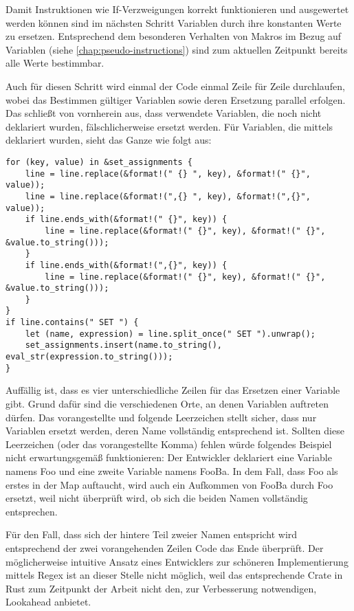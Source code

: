 Damit Instruktionen wie If-Verzweigungen korrekt funktionieren und ausgewertet werden können sind im nächsten Schritt Variablen durch ihre konstanten Werte zu ersetzen. Entsprechend dem besonderen Verhalten von Makros im Bezug auf Variablen (siehe \ref{chap:pseudo-instructions}) sind zum aktuellen Zeitpunkt bereits alle Werte bestimmbar.

Auch für diesen Schritt wird einmal der Code einmal Zeile für Zeile durchlaufen, wobei das Bestimmen gültiger Variablen sowie deren Ersetzung parallel erfolgen. Das schließt von vornherein aus, dass verwendete Variablen, die noch nicht deklariert wurden, fälschlicherweise ersetzt werden. Für Variablen, die mittels  deklariert wurden, sieht das Ganze wie folgt aus:

\begin{verbatim}
for (key, value) in &set_assignments {
	line = line.replace(&format!(" {} ", key), &format!(" {}", value));
    line = line.replace(&format!(",{} ", key), &format!(",{}", value));
    if line.ends_with(&format!(" {}", key)) {
    	line = line.replace(&format!(" {}", key), &format!(" {}", &value.to_string()));
    }
    if line.ends_with(&format!(",{}", key)) {
        line = line.replace(&format!(" {}", key), &format!(" {}", &value.to_string()));
    }
}
if line.contains(" SET ") {
	let (name, expression) = line.split_once(" SET ").unwrap();
    set_assignments.insert(name.to_string(), eval_str(expression.to_string()));
}
\end{verbatim}

Auffällig ist, dass es vier unterschiedliche Zeilen für das Ersetzen einer Variable gibt. Grund dafür sind die verschiedenen Orte, an denen Variablen auftreten dürfen. Das vorangestellte und folgende Leerzeichen stellt sicher, dass nur Variablen ersetzt werden, deren Name vollständig entsprechend ist. Sollten diese Leerzeichen (oder das vorangestellte Komma) fehlen würde folgendes Beispiel nicht erwartungsgemäß funktionieren: Der Entwickler deklariert eine Variable namens \glqq Foo\grqq{} und eine zweite Variable namens \glqq FooBa\grqq. In dem Fall, dass Foo als erstes in der Map  auftaucht, wird auch ein Aufkommen von FooBa durch Foo ersetzt, weil nicht überprüft wird, ob sich die beiden Namen vollständig entsprechen.

Für den Fall, dass sich der hintere Teil zweier Namen entspricht wird entsprechend der zwei vorangehenden Zeilen Code das Ende überprüft. Der möglicherweise intuitive Ansatz eines Entwicklers zur schöneren Implementierung mittels Regex ist an dieser Stelle nicht möglich, weil das entsprechende Crate in Rust zum Zeitpunkt der Arbeit nicht den, zur Verbesserung notwendigen, Lookahead anbietet.

